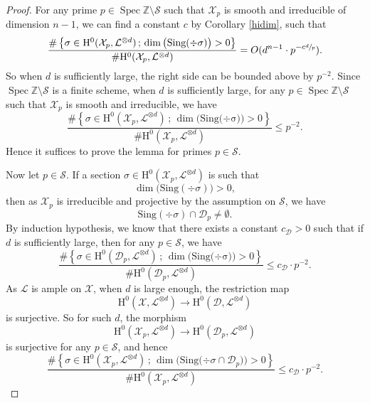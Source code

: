 \documentclass[JEP,XML,SOM,Unicode,published]{cedram}
\newcommand{\sep}{\,;\,}
\theoremstyle{plain}
\theoremstyle{definition}
\newcommand{\ho}{\mathrm{H}}
\newcommand{\X}{\mathcal{X}}
\newcommand{\li}{\mathcal{L}}
\newcommand{\Z}{\mathbb{Z}}
\DeclareMathOperator{\Spec}{Spec}
\begin{document}
\begin{proof}
For any prime $p\in \Spec \Z\setminus\mathcal{S}$ such that $\X_p$ is smooth and irreducible of dimension $n-1$, we can find a constant $c$ by Corollary \ref{hidim}, such that
\[
\frac{\#\left\{ \sigma\in \ho^0(\X_p, \li^{\otimes d})\sep \dim\big(\mathrm{Sing(\div \sigma})\big)>0 \right\}}{\#\ho^0(\X_p, \li^{\otimes d})}=O(d^{n-1}\cdot p^{-c\sfrac{d}{p}}).
\]
So when $d$ is sufficiently large, the right side can be bounded above by $p^{-2}$. Since $\Spec \Z\setminus\mathcal{S}$ is a finite scheme, when $d$ is sufficiently large, for any $p\in \Spec \Z\setminus\mathcal{S}$ such that $\X_p$ is smooth and irreducible, we have
\[
\frac{\#\left\{ \sigma\in \ho^0(\X_p, \li^{\otimes d})\sep \dim\big(\mathrm{Sing(\div \sigma})\big)>0 \right\}}{\#\ho^0(\X_p, \li^{\otimes d})}\leq p^{-2}.
\]
Hence it suffices to prove the lemma for primes $p\in \mathcal{S}$.


Now let $p\in \mathcal{S}$. If a section $\sigma\in \ho^0(\X_p, \li^{\otimes d})$ is such that
\[
\dim\big(\mathrm{Sing}(\div \sigma) \big)>0,
\]
then as $\X_p$ is irreducible and projective by the assumption on $\mathcal{S}$, we have
\[
\mathrm{Sing}(\div \sigma)\cap \mathcal{D}_p\not=\emptyset.
\]
By induction hypothesis, we know that there exists a constant $c_\mathcal{D}>0$ such that if $d$ is sufficiently large, then for any $p\in \mathcal{S}$, we have
\[
\frac{\#\left\{ \sigma\in \ho^0(\mathcal{D}_p, \li^{\otimes d})\sep \dim\big(\mathrm{Sing(\div \sigma})\big)>0 \right\}}{\#\ho^0(\mathcal{D}_p, \li^{\otimes d})}\leq c_\mathcal{D}\cdot p^{-2}.
\]
As $\li$ is ample on $\X$, when $d$ is large enough, the restriction map
\[
\ho^0(\X, \li^{\otimes d}) \to \ho^0(\mathcal{D}, \li^{\otimes d})
\]
is surjective. So for such $d$, the morphism
\[
\ho^0(\X_p, \li^{\otimes d}) \to \ho^0(\mathcal{D}_p, \li^{\otimes d})
\]
is surjective for any $p\in \mathcal{S}$, and hence
\[
\frac{\#\left\{ \sigma\in \ho^0(\X_p, \li^{\otimes d})\sep \dim\big(\mathrm{Sing(\div }\sigma\cap \mathcal{D}_p)\big)>0 \right\}}{\#\ho^0(\X_p, \li^{\otimes d})}\leq c_\mathcal{D}\cdot p^{-2}.
\]


\end{proof}
\end{document}
